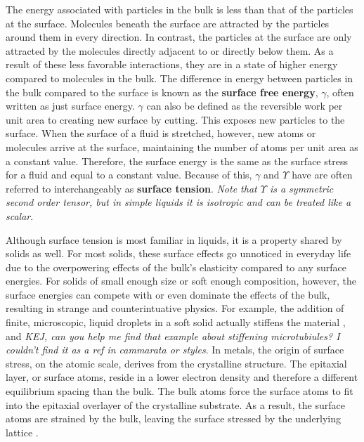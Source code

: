 The energy associated with particles in the bulk is less than that of the particles at the surface. Molecules beneath the surface are attracted by the particles around them in every direction. In contrast, the particles at the surface are only attracted by the molecules directly adjacent to or directly below them. As a result of these less favorable interactions, they are in a state of higher energy compared to molecules in the bulk. The difference in energy between particles in the bulk compared to the surface is known as the \textbf{surface free energy}, $\gamma$, often written as just surface energy. $\gamma$ can also be defined as the reversible work per unit area to creating new surface by cutting. This exposes new particles to the surface. When the surface of a fluid is stretched, however, new atoms or molecules arrive at the surface, maintaining the number of atoms per unit area as a constant value. Therefore, the surface energy is the same as the surface stress for a fluid and equal to a constant value. Because of this, $\gamma$ and $\Upsilon$ have are often referred to interchangeably as \textbf{surface tension}. \emph{Note that $\Upsilon$ is a symmetric second order tensor, but in simple liquids it is isotropic and can be treated like a scalar}.

Although surface tension is most familiar in liquids, it is a property shared by solids as well. For most solids, these surface effects go unnoticed in everyday life due to the overpowering effects of the bulk's elasticity compared to any surface energies. For solids of small enough size or soft enough composition, however, the surface energies can compete with or even dominate the effects of the bulk, resulting in strange and counterintuative physics. For example, the addition of finite, microscopic, liquid droplets in a soft solid actually stiffens the material \cite{style2015stiffening}, and \emph{KEJ, can you help me find that example about stiffening microtubiules? I couldn't find it as a ref in cammarata or styles}. In metals, the origin of surface stress, on the atomic scale, derives from the crystalline structure. The epitaxial layer, or surface atoms, reside in a lower electron density and therefore a different equilibrium spacing than the bulk. The bulk atoms force the surface atoms to fit into the epitaxial overlayer of the crystalline substrate. As a result, the surface atoms are strained by the bulk, leaving the surface stressed by the underlying lattice \cite{cammarata1994surface}. 

